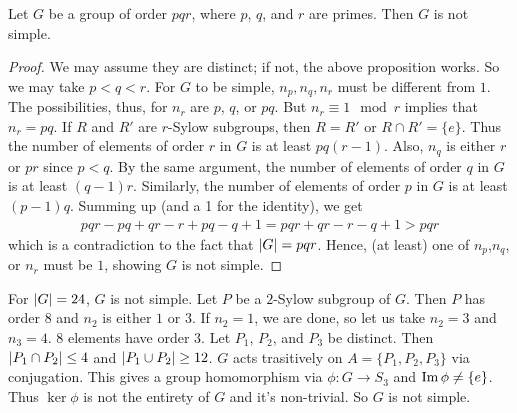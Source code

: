 \begin{proposition}
    Let $G$ be a group of order $pqr$, where $p$, $q$, and $r$ are primes. Then $G$ is not simple.
\end{proposition}
\begin{proof}
    We may assume they are distinct; if not, the above proposition works. So we may take $p < q < r$. For $G$ to be simple, $n_{p},n_{q},n_{r}$ must be different from $1$. The possibilities, thus, for $n_{r}$ are $p$, $q$, or $pq$. But $n_{r} \equiv 1 \mod r$ implies that $n_{r} = pq$. If $R$ and $R'$ are $r$-Sylow subgroups, then $R = R'$ or $R \cap R' = \{e\}$. Thus the number of elements of order $r$ in $G$ is at least $pq(r-1)$. Also, $n_{q}$ is either $r$ or $pr$ since $p < q$. By the same argument, the number of elements of order $q$ in $G$ is at least $(q-1)r$. Similarly, the number of elements of order $p$ in $G$ is at least $(p-1)q$. Summing up (and a 1 for the identity), we get
    \begin{align}
        pqr - pq + qr - r + pq - q + 1 = pqr + qr - r - q + 1 > pqr
    \end{align}
    which is a contradiction to the fact that $\left| G \right| = pqr$. Hence, (at least) one of $n_{p}$,$n_{q}$, or $n_{r}$ must be $1$, showing $G$ is not simple.
\end{proof}

\begin{example}
    For $\left| G \right| = 24$, $G$ is not simple. Let $P$ be a $2$-Sylow subgroup of $G$. Then $P$ has order $8$ and $n_{2}$ is either $1$ or $3$. If $n_{2} = 1$, we are done, so let us take $n_{2} = 3$ and $n_{3} = 4$. $8$ elements have order $3$. Let $P_{1}$, $P_{2}$, and $P_{3}$ be distinct. Then $\left| P_{1} \cap P_{2} \right| \leq 4$ and $\left| P_{1} \cup P_{2} \right| \geq 12$. $G$ acts trasitively on $A = \{P_{1},P_{2},P_{3}\}$ via conjugation. This gives a group homomorphism via $\phi:G \to S_{3}$ and $\operatorname{Im} \phi \neq \{e\}$. Thus $\ker \phi$ is not the entirety of $G$ and it's non-trivial. So $G$ is not simple.
\end{example}